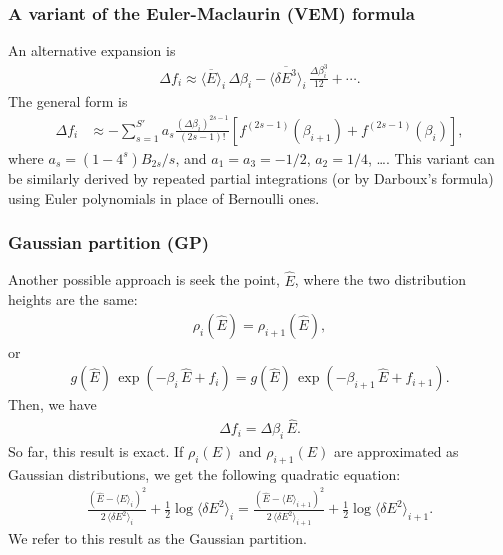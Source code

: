 \documentclass[aip,jcp,preprint,notitlepage, superscriptaddress]{revtex4-1}
\begin{document}
\subsubsection{A variant of the Euler-Maclaurin (VEM) formula}



An alternative expansion is
%
\begin{align}
\Delta f_i
\approx
\overline{ \langle E \rangle }_i \, \Delta \beta_i
-
\overline{ \langle \delta E^3 \rangle }_i
\, \frac{ \Delta \beta_i^3 } { 12 }
+ \cdots.
\label{eq:df_eavc}
\end{align}
%
The general form is
\begin{align*}
\Delta f_i
&\approx
-\sum_{s = 1}^{S'}
  a_s
  \frac{ (\Delta \beta_i)^{2s - 1} } { (2 s - 1)! }
  \left[
    f^{(2s-1)}(\beta_{i+1})
    +
    f^{(2s-1)}(\beta_i)
  \right],
\end{align*}
where
$a_s = (1 - 4^s) B_{2s} /s$,
%
and
$a_1 = a_3 = -1/2$,
$a_2 = 1/4$,
\dots.
%
This variant can be similarly derived
by repeated partial integrations
(or by Darboux's formula\cite{
whittaker, wang_specfunc})
using Euler polynomials\cite{
wang_specfunc, abramowitz}
in place of Bernoulli ones.



\subsubsection{Gaussian partition (GP)}


Another possible approach is seek the point, $\hat E$,
where the two distribution heights are the same:
%
\begin{align*}
\rho_i(\hat E)
=
\rho_{i+1}(\hat E),
\end{align*}
%
or
\begin{align*}
g(\hat E) \, \exp(-\beta_i \, \hat E + f_i)
=
g(\hat E) \, \exp(-\beta_{i+1} \, \hat E + f_{i+1}).
\end{align*}
%
Then,
we have
\begin{align}
  \Delta f_i = \Delta \beta_i \, \hat E.
  \label{eq:df_gpart}
\end{align}
%
So far,
this result is exact.
%
If $\rho_i(E)$ and $\rho_{i+1}(E)$
are approximated as Gaussian distributions,
we get the following quadratic equation:
\begin{align}
  \frac{ (\hat E - \langle E \rangle_i)^2 }
  { 2 \, \langle \delta E^2 \rangle_i }
  +\frac 1 2
  \log
  \langle \delta E^2 \rangle_i
=
  \frac{ (\hat E - \langle E \rangle_{i+1})^2 }
  { 2 \, \langle \delta E^2 \rangle_{i+1} }
  +\frac 1 2
  \log
  \langle \delta E^2 \rangle_{i+1} .
\end{align}
%
We refer to this result
as the Gaussian partition.
\end{document}
